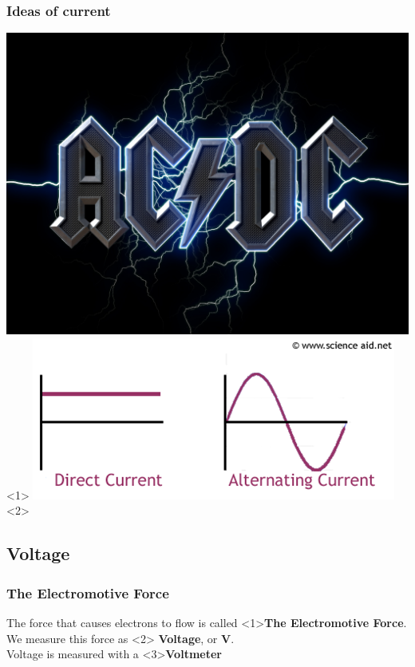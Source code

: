 \documentclass[10pt]{beamer}
\begin{document}
\begin{frame}
\frametitle{Ideas of current}
\begin{center}
\includegraphics[height=.9\textheight]{acdc.jpg}<1>
\includegraphics[width=\textwidth]{acdc.png}<2>
\end{center}
\end{frame}

\subsection{Voltage}
\begin{frame}
\frametitle{The Electromotive Force}
The force that causes electrons to flow is called \only{\ldots}<1>\pause \textbf{The Electromotive Force}.\\
 We measure this force as \only{\ldots}<2>\pause\textbf{ Voltage}, or \textbf{V}.\\
Voltage is measured with a \only{\ldots}<3>\pause \textbf{Voltmeter}
\end{frame}
\end{document}
